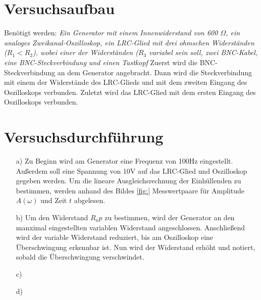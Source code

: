 
\section{Versuchsaufbau}\justifying
Benötigt werden: \textit{Ein Generator mit einem Innenwiderstand von 600 $\Omega$, 
ein analoges Zweikanal-Oszilloskop, ein LRC-Glied mit drei ohmschen Widerständen 
($R_1 < R_2$), wobei einer der Widerständen ($R_3$ variabel sein soll, 
zwei BNC-Kabel, eine BNC-Steckverbindung und einen Tastkopf}
Zuerst wird die BNC-Steckverbindung an dem Generator angebracht. 
Dann wird die Steckverbindung mit einem der Widerstände des LRC-Glieds und mit dem zweiten 
Eingang des Oszilloskops verbunden.
Zuletzt wird das LRC-Glied mit dem ersten Eingang des Oszilloskops verbunden.



\section{Versuchsdurchführung}\justifying

 \begin{enumerate}

    \item[a)] \justifying Zu Beginn wird am Generator eine Frequenz von 100Hz 
    eingestellt. Außerdem soll eine Spannung von 10V auf das LRC-Glied und Oszilloskop
    gegeben werden. 
    Um die lineare Ausgleichsrechnung der Einhüllenden zu bestimmen,
    werden anhand des Bildes \ref{fig:} Messwertpaare für Amplitude $A(\omega)$ und Zeit 
    $t$ abgelesen. 

    \item[b)] \justifying Um den Widerstand $R_ap$ zu bestimmen, wird der Generator 
    an den manximal eingestellten variablen Widerstand angeschlossen. Anschließend wird 
    der variable Widerstand reduziert, bis am Oszilloskop eine Überschwingung erkennbar 
    ist. Nun wird der Widerstand erhöht und notiert, sobald die Überschwingung verschwindet.
  
    \item[c)] \justifying 
  
    \item[d)] \justifying 

  \end{enumerate}

